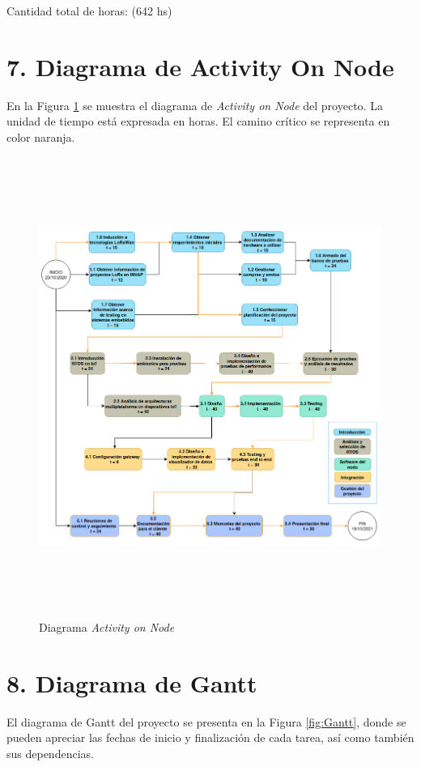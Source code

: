\documentclass[11pt]{charter}
\begin{document}
Cantidad total de horas: (642 hs)


\section{7. Diagrama de Activity On Node}
\label{sec:AoN}

En la Figura \ref{fig:AoN} se muestra el diagrama de \textit{Activity on Node} del proyecto. La unidad de tiempo está expresada en horas.
El camino crítico se representa en color naranja.
\begin{figure}[htpb]
\centering 
\includegraphics[width=16cm, height=15cm]{./Figuras/aon.png}
\caption{Diagrama \textit{Activity on Node}}
\label{fig:AoN}
\end{figure}



\section{8. Diagrama de Gantt}
\label{sec:gantt}

El diagrama de Gantt del proyecto se presenta en la Figura \ref{fig:Gantt}, donde se pueden apreciar las fechas de inicio y finalización de cada tarea, así como también sus dependencias.
\end{document}
